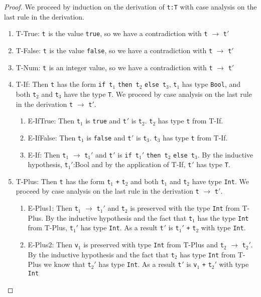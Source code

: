 \documentclass{article}
\newcommand{\term}[1]{{\tt t$_{#1}$}}
\begin{document}
\begin{enumerate}
    \begin{proof}
      We proceed by induction on the derivation of \verb|t:T| with case analysis on the last rule in the derivation.
      \begin{enumerate}
        \item T-True: \term{} is the value \verb|true|, so we have a contradiction with \verb|t| $\longrightarrow$ \verb|t|$'$
        \item T-False: \term{} is the value \verb|false|, so we have a contradiction with \verb|t| $\longrightarrow$ \verb|t|$'$
        \item T-Num: \term{} is an integer value,  so we have a contradiction with \verb|t| $\longrightarrow$ \verb|t|$'$
        \item T-If: Then \term{} has the form \verb|if t|$_1$ \verb|then t|$_2$ \verb|else t|$_3$, \term{1} has type \verb|Bool|, and both \term{2} and \term{3} have the type \verb|T|. We proceed by case analysis on the last rule in the derivation \verb|t| $\longrightarrow$ \verb|t|$'$.
          \begin{enumerate}
            \item E-IfTrue: Then \term{1} is \verb|true| and \term{}$'$ is \term{2}. \term{2} has type \verb|t| from T-If.
            \item E-IfFalse: Then \term{1} is \verb|false| and \term{}$'$ is \term{3}. \term{3} has type \verb|t| from T-If.
            \item E-If:  Then \term{1} $\longrightarrow$ \term{1}$'$ and \term{}$'$ is \verb|if t|$_1'$ \verb|then t|$_2$ \verb|else t|$_3$. By the inductive hypothesis, \term{1}$'$:Bool and by the application of T-If, \term{}$'$ has type \verb|T|.
          \end{enumerate}
        \item T-Plus: Then \term{} has the form \term{1} \verb|+| \term{2} and both \term{1} and \term{2} have type \verb|Int|. We proceed by case analysis on the last rule in the derivation \verb|t| $\longrightarrow$ \verb|t|$'$.
          \begin{enumerate}
            \item E-Plus1: Then \term{1} $\longrightarrow$ \term{1}$'$ and \term{2} is preserved with the type \verb|Int| from T-Plus. By the inductive hypothesis and the fact that \term{1} has the type \verb|Int| from T-Plus, \term{1}$'$ has type \verb|Int|. As a result \term{}$'$ is \term{1}$'$ \verb|+| \term{2} with type \verb|Int|.
            \item E-Plus2: Then \verb|v|$_1$ is preserved with type \verb|Int| from T-Plus and \term{2} $\longrightarrow$ \term{2}$'$. By the inductive hypothesis and the fact that \term{2} has type \verb|Int| from T-Plus we know that \term{2}$'$ has type \verb|Int|. As a result \term{}$'$ is \verb|v|$_1$ \verb|+| \term{2}$'$ with type \verb|Int|

\end{enumerate}
\end{enumerate}
\end{proof}
\end{enumerate}
\end{document}
